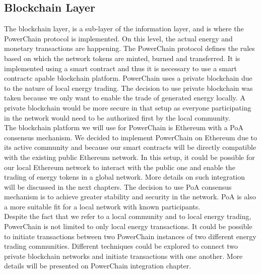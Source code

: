 \subsection{Blockchain Layer}
The blockchain layer, is a sub-layer of the information layer, and is where the PowerChain protocol is implemented. On this level, the actual energy and monetary transactions are happening. The PowerChain protocol defines the rules based on which the network tokens are minted,
burned and transferred. It is implemented using a smart contract and thus it is necessary to use a smart contractc apable blockchain platform.
PowerChain uses a private blockchain due to the nature of local energy trading. The decision to use private blockchain was taken because we only want to enable the trade of generated energy locally. A private
blockchain would be more secure in that setup as everyone participating in the network would need to be authorized first by the local community.\\
The blockchain platform we will use for PowerChain is Ethereum with a PoA consensus mechanism. We decided to implement PowerChain on Ethereum due to its active community and because our smart contracts will be directly compatible with the
existing public Ethereum network. In this setup, it could be possible for our local Ethereum network to interact with the public one and enable the trading of energy tokens in a global network. More details on such integration will be
discussed in the next chapters. The decision to use PoA consensus mechanism is to achieve greater stability and security in the network. PoA is also a more suitable fit for a local network with known participants. \cite{manolache2022decision} \\
Despite the fact that we refer to a local community and to local energy trading, PowerChain is not limited to only local energy transactions. It could be possible to initiate transactions between two PowerChain instances of two different
energy trading communities. Different techniques could be explored to connect two private blockchain networks and initiate transactions with one another. More details will be presented on PowerChain integration chapter.

